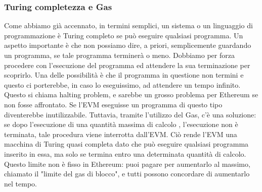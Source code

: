 \subsubsection{Turing completezza e Gas}
Come abbiamo già accennato, in termini semplici, un sistema o un linguaggio di programmazione è Turing completo se può eseguire qualsiasi programma. Un aspetto importante è che non possiamo dire, a priori, semplicemente guardando un programma, se tale programma terminerà o meno. Dobbiamo per forza procedere con l'esecuzione del programma ed attendere la sua terminazione per scoprirlo. Una delle possibilità è che il programma in questione non termini e questo ci porterebbe, in caso lo eseguissimo, ad attendere un tempo infinito. Questo si chiama halting problem, e sarebbe un grosso problema per Ethereum se non fosse affrontato. Se l'EVM eseguisse un programma di questo tipo diventerebbe inutilizzabile. Tuttavia, tramite l'utilizzo del Gas, c'è una soluzione: se dopo l'esecuzione di una quantità massima di calcolo , l'esecuzione non è terminata, tale procedura viene interrotta dall'EVM. Ciò rende l'EVM una macchina di Turing quasi completa dato che può eseguire qualsiasi programma inserito in essa, ma solo se termina entro una determinata quantità di calcolo. Questo limite non è fisso in Ethereum: puoi pagare per aumentarlo al massimo, chiamato il "limite del gas di blocco", e tutti possono concordare di aumentarlo nel tempo. 

